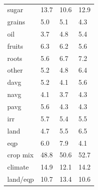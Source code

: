 \documentclass[12pt]{article}
\begin{document}
\begin{table}[h!]
{\begin{tabular}{llll}
sugar & 13.7 & 10.6 & 12.9 \\
grains & 5.0 & 5.1 & 4.3 \\
oil & 3.7 & 4.8 & 5.4 \\
fruits & 6.3 & 6.2 & 5.6 \\
roots & 5.6 & 6.7 & 7.2 \\
other & 5.2 & 4.8 & 6.4 \\
davg & 5.2 & 4.1 & 5.6 \\
navg & 4.1 & 3.7 & 4.3 \\
pavg & 5.6 & 4.3 & 4.3 \\
irr & 5.7 & 5.4 & 5.5 \\
land & 4.7 & 5.5 & 6.5 \\
eqp & 6.0 & 7.9 & 4.1 \\
\midrule
crop mix & 48.8 & 50.6 & 52.7 \\
climate & 14.9 & 12.1 & 14.2 \\
land/eqp & 10.7 & 13.4 & 10.6 \\
\bottomrule
\end{tabular}
\caption{ }
\label{t.wy.temp_percentages}
}
\end{table}
\end{document}
